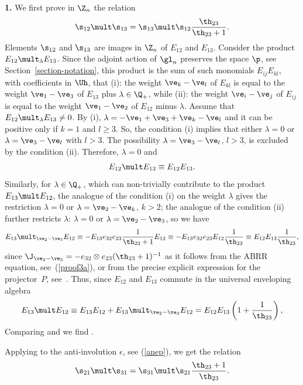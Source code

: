 {\bf 1.} We f\/irst prove in $\Z_n$ the relation
\begin{gather}\label{proof7}
\s_{12}\mult\s_{13}=\s_{13}\mult\s_{12}  \frac{\th_{23}}{\th_{23}+1}  .
\end{gather}
Elements $\s_{12}$ and $\s_{13}$ are images in $\Z_n$ of $E_{12}$ and $E_{13}$. Consider the
product $E_{12}\mult_\lambda E_{13}$. Since the adjoint action of $\gl_n$ preserves the space
$\p$, see Section~\ref{section-notation}, this product is the sum of such monomials $E_{ij}E_{kl}$,
with coef\/f\/icients in $\Uh$, that (i): the weight $\ve_k-\ve_l$
of $E_{kl}$ is equal to the weight $\ve_{1}-\ve_3$ of $E_{13}$ plus $\lambda\in\Q_+$, while (ii): the
weight $\ve_i-\ve_j$ of $E_{ij}$ is equal to the weight $\ve_{1}-\ve_2$ of $E_{12}$ minus
$\lambda$. Assume that $E_{12}\mult_\lambda E_{13}\neq 0$. By (i), $\lambda =-\ve_1+\ve_3+\ve_k-\ve_l$
and it can be positive only if $k=1$ and $l\geq 3$. So, the condition (i) implies that either
$\lambda=0$ or $\lambda=\ve_3-\ve_l$ with $l>3$. The possibility $\lambda=\ve_3-\ve_l$, $l>3$, is excluded
by the condition (ii). Therefore, $\lambda=0$ and
\begin{gather}
\label{proof8}
E_{12}\mult E_{13}\equiv E_{12}E_{13} .
\end{gather}
Similarly, for $\lambda\in\Q_+$, which can non-trivially contribute to the product $E_{13}\mult E_{12}$,
the analogue of the condition (i) on the weight $\lambda$ gives the
restriction $\lambda =0$ or $\lambda=\ve_2-\ve_k$, $k>2$; the analogue of the condition (ii)
further restricts $\lambda$:  $\lambda=0$ or $\lambda=\ve_2-\ve_3$, so we have
\begin{gather*}
E_{13}\mult_{\ve_2-\ve_3} E_{12}\equiv -E_{13}e_{32}e_{23}  \frac{1}{\th_{23}+1}E_{12}\equiv
-E_{13}e_{32}e_{23}E_{12}  \frac{1}{\th_{23}}\equiv E_{12}E_{13}  \frac{1}{\th_{23}}  ,
\end{gather*}
since $\J_{\ve_2-\ve_3}=-e_{32}\otimes e_{23}(\th_{23}+1)^{-1}$ as it follows from the ABRR
equation, see~(\ref{proof3a}), or from the precise explicit expression for the projector~$P$,
see~\cite{AST}. Thus, since $E_{12}$ and $E_{13}$ commute in the universal enveloping algebra
\begin{gather}\label{proof9}E_{13}\mult E_{12}\equiv E_{13}E_{12}+E_{13}\mult_{\ve_2-\ve_3} E_{12}=
E_{12}E_{13}\left(1+\frac{1}{\th_{23}}\right),
\end{gather}
Comparing  and  we f\/ind .


Applying to  the anti-involution $\epsilon$, see (\ref{anep}), we get the relation
\begin{gather}\label{proof10}
\s_{21}\mult\s_{31}=\s_{31}\mult\s_{21}  \frac{\th_{23}+1}{\th_{23}}  .
\end{gather}

